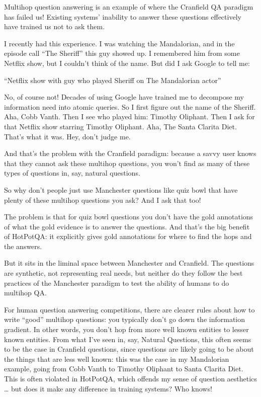 Multihop question answering is an example of where the Cranfield QA paradigm has failed us!  Existing systems’ inability to answer these questions effectively have trained us not to ask them.  

I recently had this experience.  I was watching the Mandalorian, and in the episode call “The Sheriff” this guy showed up.  I remembered him from some Netflix show, but I couldn’t think of the name.  But did I ask Google to tell me:

“Netflix show with guy who played Sheriff on The Mandalorian actor”

No, of course not!  Decades of using Google have trained me to decompose my information need into atomic queries.  So I first figure out the name of the Sheriff.  Aha, Cobb Vanth.  Then I see who played him: Timothy Oliphant.  Then I ask for that Netflix show starring Timothy Oliphant.  Aha, The Santa Clarita Diet.  That’s what it was.  Hey, don’t judge me.

And that’s the problem with the Cranfield paradigm: because a savvy user knows that they cannot ask these multihop questions, you won’t find as many of these types of questions in, say, natural questions.  

So why don’t people just use Manchester questions like quiz bowl that have plenty of these multihop questions you ask?  And I ask that too!

The problem is that for quiz bowl questions you don’t have the gold annotations of what the gold evidence is to answer the questions.  And that’s the big benefit of HotPotQA: it explicitly gives gold annotations for where to find the hops and the answers. 

But it sits in the liminal space between Manchester and Cranfield.  The questions are synthetic, not representing real needs, but neither do they follow the best practices of the Manchester paradigm to test the ability of humans to do multihop QA.

For human question answering competitions, there are clearer rules about how to write “good” multihop questions: you typically don’t go down the information gradient.  In other words, you don’t hop from more well known entities to lesser known entities.  From what I’ve seen in, say, Natural Questions, this often seems to be the case in Cranfield questions, since questions are likely going to be about the things that are less well known: this was the case in my Mandalorian example, going from Cobb Vanth to Timothy Oliphant to Santa Clarita Diet.  This is often violated in HotPotQA, which offends my sense of question aesthetics … but does it make any difference in training systems?  Who knows!  

